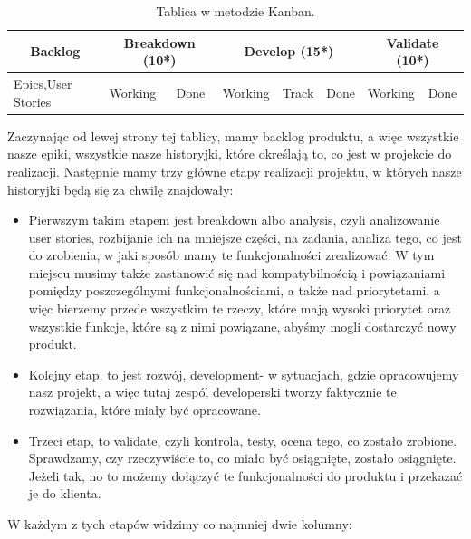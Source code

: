 \begin{table}
\centering\caption{Tablica w metodzie Kanban.}\label{tabela:kanban}
\begin{tabular}{*8{l} }%
\toprule
\multicolumn{1}{|c|}{\textbf{Backlog}} &\multicolumn{2}{|c|}{\textbf{Breakdown (10*)}} & \multicolumn{3}{|c|}{\textbf{Develop (15*)}} & \multicolumn{2}{|c|}{\textbf{Validate (10*)}} \\
\midrule
Epics,User Stories & Working
& Done & Working & Track & Done & Working & Done \\
\bottomrule
\end{tabular}
\end{table}

Zaczynając od lewej strony tej tablicy, mamy backlog produktu, a więc wszystkie nasze epiki, wszystkie nasze historyjki, które określają to, co jest w projekcie do realizacji.
Następnie mamy trzy główne etapy realizacji projektu, w których nasze historyjki będą się za chwilę znajdowały:

\begin{itemize}
	\item Pierwszym takim etapem jest breakdown albo analysis, czyli analizowanie user stories,
	rozbijanie ich na mniejsze części, na zadania, analiza tego, co jest do zrobienia, w jaki sposób mamy te funkcjonalności zrealizować.
	W tym miejscu musimy także zastanowić się nad kompatybilnością i powiązaniami pomiędzy poszczególnymi funkcjonalnościami,
	a także nad priorytetami, a więc bierzemy przede wszystkim te rzeczy, które mają wysoki priorytet oraz wszystkie funkcje,
	które są z nimi powiązane, abyśmy mogli dostarczyć nowy produkt. 
	\item Kolejny etap, to jest rozwój, development- w sytuacjach, gdzie opracowujemy nasz projekt,
	a więc tutaj zespól developerski tworzy faktycznie te rozwiązania, które miały być opracowane.
	\item Trzeci etap, to validate, czyli kontrola, testy, ocena tego, co zostało zrobione.
	Sprawdzamy, czy rzeczywiście to, co miało być osiągnięte, zostało osiągnięte.
	Jeżeli tak, no to możemy dołączyć te funkcjonalności do produktu i przekazać je do klienta.
\end{itemize}

W każdym z tych etapów widzimy co najmniej dwie kolumny:

